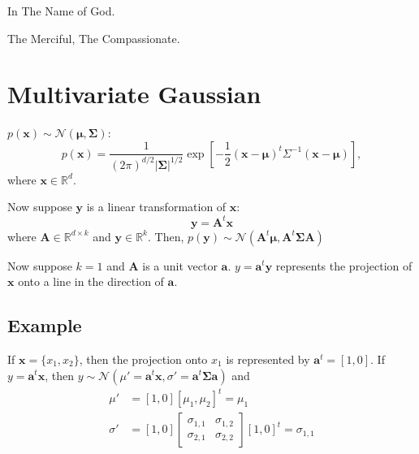 \documentclass[a4paper,12pt]{report}
\begin{document}
\begin{center}
In The Name of God.

The Merciful, The Compassionate.
\end{center}

\section*{Multivariate Gaussian}
$p(\mathbf{x}) \sim \mathcal{N}(\mathbf{\mu},\mathbf{\Sigma})$:
\begin{equation}
p(\mathbf{x}) = \frac{1}{(2\pi)^{d/2}|\mathbf{\Sigma}|^{1/2}}\exp \left[-\frac{1}{2}(\mathbf{x}-\mathbf{\mu})^t \Sigma^{-1}(\mathbf{x}-\mathbf{\mu})\right],
\end{equation}
where $\mathbf{x} \in \mathbb{R}^d$.

Now suppose $\mathbf{y}$ is a linear transformation of $\mathbf{x}$:
\begin{equation}
\mathbf{y} = \mathbf{A}^t\mathbf{x}
\end{equation}
where $\mathbf{A} \in \mathbb{R}^{d \times k}$ and $\mathbf{y} \in \mathbb{R}^k$. Then, 
$p(\mathbf{y}) \sim \mathcal{N}(\mathbf{A}^t\mathbf{\mu}, \mathbf{A}^t \mathbf{\Sigma} \mathbf{A})$

Now suppose $k=1$ and $\mathbf{A}$ is a unit vector $\mathbf{a}$. $y=\mathbf{a}^t\mathbf{y}$ represents the projection of $\mathbf{x}$ onto a line in the direction of $\mathbf{a}$.

\subsection*{Example}
If $\mathbf{x}=\lbrace x_1,x_2 \rbrace$, then the projection onto $x_1$ is represented by $\mathbf{a}^t=\left[1,0\right]$. 
If $y = \mathbf{a}^t \mathbf{x}$, then $y \sim \mathcal{N}(\mu' = \mathbf{a}^t\mathbf{x}, \sigma' = \mathbf{a}^t \mathbf{\Sigma} \mathbf{a})$ and
\begin{align*}
\mu' &= \left[1,0\right]\left[\mu_1,\mu_2\right]^t = \mu_1 \\
\sigma' &= \left[1,0\right] \left[\begin{array}{cc}
\sigma_{1,1} & \sigma_{1,2} \\
\sigma_{2,1} & \sigma_{2,2}
\end{array}\right]
\left[1,0\right]^t =\sigma_{1,1}
\end{align*}
\end{document}
